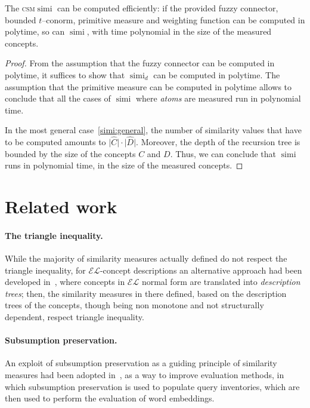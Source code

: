 \documentclass{llncs}
\DeclareMathOperator{\simi}{simi}
\newcommand{\el}{\(\mathcal{EL}\)\xspace}
\newcommand{\csm}{\textsc{csm}\xspace}
\begin{document}
  \begin{proposition}
    The \csm \(\simi\) can be computed efficiently: if the provided fuzzy connector, bounded \(t\)--conorm, primitive measure and weighting function can be computed in polytime, so can \(\simi\), with time polynomial in the size of the measured concepts.
  \end{proposition}
  \begin{proof}
    From the assumption that the fuzzy connector can be computed in polytime, it suffices to show that \(\simi_d\) can be computed in polytime.
    The assumption that the primitive measure can be computed in polytime allows to conclude that all the cases of \(\simi\) where \emph{atoms} are measured run in polynomial time.

    In the most general case~\eqref{simi:general}, the number of similarity values that have to be computed amounts to \(\lvert \widehat{C} \rvert \cdot \lvert \widehat{D} \rvert\).
    Moreover, the depth of the recursion tree is bounded by the size of the concepts \(C\) and \(D\).
    Thus, we can conclude that \(\simi\) runs in polynomial time, in the size of the measured concepts.
  \end{proof}

  \section{Related work}

  \paragraph{The triangle inequality.} While the majority of similarity measures actually defined do not respect the triangle inequality, for \el-concept descriptions an alternative approach had been developed in~\cite{DAB14}, where concepts in \el normal form are translated into \emph{description trees}; then, the similarity measures in there defined, based on the description trees of the concepts, though being non monotone and not structurally dependent, respect triangle inequality.

  \paragraph{Subsumption preservation.} An exploit of subsumption preservation as a guiding principle of similarity measures had been adopted in~\cite{Se16},
  as a way to improve evaluation methods, in which subsumption preservation is used to populate query inventories, which are then used to perform the evaluation of word embeddings.
\end{document}
